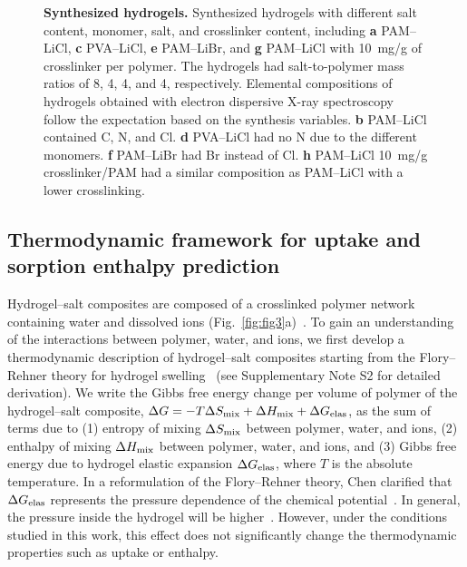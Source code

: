 \documentclass[11pt]{article}
\begin{document}
\begin{figure}[t]
\centering
{}
\caption{\textbf{Synthesized hydrogels.} Synthesized hydrogels with different salt content, monomer, salt, and crosslinker content, including \textbf{a} PAM--LiCl, \textbf{c} PVA--LiCl, \textbf{e} PAM--LiBr, and \textbf{g} PAM--LiCl with 10~mg/g of crosslinker per polymer. The hydrogels had salt-to-polymer mass ratios of 8, 4, 4, and 4, respectively. Elemental compositions of hydrogels obtained with electron dispersive X-ray spectroscopy follow the expectation based on the synthesis variables. \textbf{b} PAM--LiCl contained C, N, and Cl. \textbf{d} PVA--LiCl had no N due to the different monomers. \textbf{f} PAM--LiBr had Br instead of Cl. \textbf{h} PAM--LiCl 10~mg/g crosslinker/PAM had a similar composition as PAM--LiCl with a lower crosslinking.}
\label{fig:fig2}
\end{figure}

\subsection{Thermodynamic framework for uptake and sorption enthalpy prediction}

Hydrogel--salt composites are composed of a crosslinked polymer network containing water and dissolved ions (Fig.~\ref{fig:fig3}a)~\cite{graeber2023,li2018b,kallenberger2018,diazmarin2022b,shan2023b}. To gain an understanding of the interactions between polymer, water, and ions, we first develop a thermodynamic description of hydrogel--salt composites starting from the Flory--Rehner theory for hydrogel swelling~\cite{flory1953} (see Supplementary Note S2 for detailed derivation). We write the Gibbs free energy change per volume of polymer of the hydrogel--salt composite, $\Delta G = -T\Delta S_{\rm mix} + \Delta H_{\rm mix} + \Delta G_{\rm elas}$, as the sum of terms due to (1) entropy of mixing $\Delta S_{\rm mix}$ between polymer, water, and ions, (2) enthalpy of mixing $\Delta H_{\rm mix}$ between polymer, water, and ions, and (3) Gibbs free energy due to hydrogel elastic expansion $\Delta G_{\rm elas}$, where $T$ is the absolute temperature. In a reformulation of the Flory--Rehner theory, Chen clarified that $\Delta G_{\rm elas}$ represents the pressure dependence of the chemical potential~\cite{chen2022,flory1953,chen2022b}. In general, the pressure inside the hydrogel will be higher~\cite{chen2022}. However, under the conditions studied in this work, this effect does not significantly change the thermodynamic properties such as uptake or enthalpy.
\end{document}
